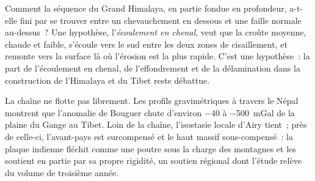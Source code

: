 \begin{omfigure}
\par{}
\end{omfigure}

Comment la séquence du Grand Himalaya, en partie fondue en profondeur, a-t-elle fini par se trouver entre un
chevauchement en dessous et une faille normale au-dessus~? Une hypothèse, l'\emph{écoulement en chenal}, veut
que la croûte moyenne, chaude et faible, s'écoule vers le sud entre les deux zones de cisaillement, et
remonte vers la surface là où l'érosion est la plus rapide. C'est une hypothèse~: la part de l'écoulement en
chenal, de l'effondrement et de la délamination dans la construction de l'Himalaya et du Tibet reste débattue.

La chaîne ne flotte pas librement. Les profils gravimétriques à travers le Népal montrent
que l'anomalie de Bouguer chute d'environ $-40$ à \qty{-500}{mGal} de la plaine du
Gange au Tibet. Loin de la chaîne, l'isostasie locale d'Airy tient~; près de celle-ci,
l'avant-pays est surcompensé et le haut massif sous-compensé~: la plaque indienne
fléchit comme une poutre sous la charge des montagnes et les soutient en partie par sa
propre rigidité, un soutien régional dont l'étude relève du volume de troisième année.

